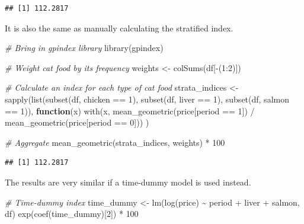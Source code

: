 \documentclass[
]{article}
\newenvironment{Shaded}{\begin{snugshade}}{\end{snugshade}}
\newcommand{\CommentTok}[1]{\textcolor[rgb]{0.56,0.35,0.01}{\textit{#1}}}
\newcommand{\ControlFlowTok}[1]{\textcolor[rgb]{0.13,0.29,0.53}{\textbf{#1}}}
\newcommand{\DecValTok}[1]{\textcolor[rgb]{0.00,0.00,0.81}{#1}}
\newcommand{\FunctionTok}[1]{\textcolor[rgb]{0.00,0.00,0.00}{#1}}
\newcommand{\NormalTok}[1]{#1}
\newcommand{\OtherTok}[1]{\textcolor[rgb]{0.56,0.35,0.01}{#1}}
\newcommand{\SpecialCharTok}[1]{\textcolor[rgb]{0.00,0.00,0.00}{#1}}
\begin{document}
\begin{verbatim}
## [1] 112.2817
\end{verbatim}

It is also the same as manually calculating the stratified index.

\begin{Shaded}
\begin{Highlighting}[]
\CommentTok{\# Bring in gpindex library}
\FunctionTok{library}\NormalTok{(gpindex)}

\CommentTok{\# Weight cat food by its frequency}
\NormalTok{weights }\OtherTok{\textless{}{-}} \FunctionTok{colSums}\NormalTok{(df[}\SpecialCharTok{{-}}\NormalTok{(}\DecValTok{1}\SpecialCharTok{:}\DecValTok{2}\NormalTok{)])}

\CommentTok{\# Calculate an index for each type of cat food}
\NormalTok{strata\_indices }\OtherTok{\textless{}{-}} 
  \FunctionTok{sapply}\NormalTok{(}\FunctionTok{list}\NormalTok{(}\FunctionTok{subset}\NormalTok{(df, chicken }\SpecialCharTok{==} \DecValTok{1}\NormalTok{), }
              \FunctionTok{subset}\NormalTok{(df, liver }\SpecialCharTok{==} \DecValTok{1}\NormalTok{), }
              \FunctionTok{subset}\NormalTok{(df, salmon }\SpecialCharTok{==} \DecValTok{1}\NormalTok{)),}
         \ControlFlowTok{function}\NormalTok{(x) }\FunctionTok{with}\NormalTok{(x, }\FunctionTok{mean\_geometric}\NormalTok{(price[period }\SpecialCharTok{==} \DecValTok{1}\NormalTok{]) }\SpecialCharTok{/} \FunctionTok{mean\_geometric}\NormalTok{(price[period }\SpecialCharTok{==} \DecValTok{0}\NormalTok{]))}
\NormalTok{         )}

\CommentTok{\# Aggregate}
\FunctionTok{mean\_geometric}\NormalTok{(strata\_indices, weights) }\SpecialCharTok{*} \DecValTok{100}
\end{Highlighting}
\end{Shaded}

\begin{verbatim}
## [1] 112.2817
\end{verbatim}

The results are very similar if a time-dummy model is used instead.

\begin{Shaded}
\begin{Highlighting}[]
\CommentTok{\# Time{-}dummy index}
\NormalTok{time\_dummy }\OtherTok{\textless{}{-}} \FunctionTok{lm}\NormalTok{(}\FunctionTok{log}\NormalTok{(price) }\SpecialCharTok{\textasciitilde{}}\NormalTok{ period }\SpecialCharTok{+}\NormalTok{ liver }\SpecialCharTok{+}\NormalTok{ salmon, df)}
\FunctionTok{exp}\NormalTok{(}\FunctionTok{coef}\NormalTok{(time\_dummy)[}\DecValTok{2}\NormalTok{]) }\SpecialCharTok{*} \DecValTok{100}
\end{Highlighting}
\end{Shaded}
\end{document}
